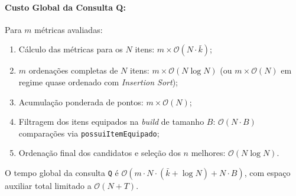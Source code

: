 \documentclass[letterpaper]{article}
\begin{document}
\paragraph{Custo Global da Consulta Q:}
Para $m$ métricas avaliadas:
\begin{enumerate}
    \item Cálculo das métricas para os $N$ itens: $m \times \mathcal{O}(N \cdot \bar{k})$;
    \item $m$ ordenações completas de $N$ itens: $m \times \mathcal{O}(N \log N)$ (ou $m \times \mathcal{O}(N)$ em regime quase ordenado com \textit{Insertion Sort});
    \item Acumulação ponderada de pontos: $m \times \mathcal{O}(N)$;
    \item Filtragem dos itens equipados na \textit{build} de tamanho $B$: $\mathcal{O}(N \cdot B)$ comparações via \texttt{possuiItemEquipado};
    \item Ordenação final dos candidatos e seleção dos $n$ melhores: $\mathcal{O}(N \log N)$.
\end{enumerate}
O tempo global da consulta \texttt{Q} é $\mathcal{O}(m \cdot N \cdot (\bar{k} + \log N) + N \cdot B)$, com espaço auxiliar total limitado a $\mathcal{O}(N + T)$.
\end{document}
